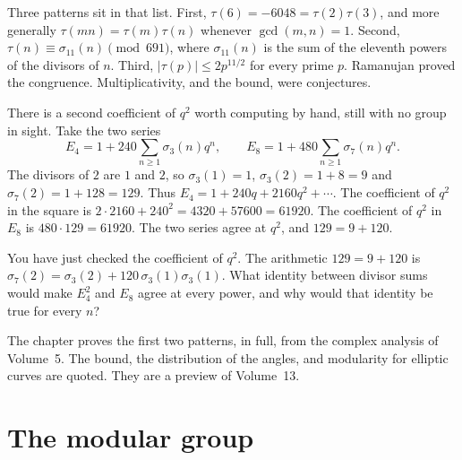 Three patterns sit in that list. First, $\tau(6)=-6048=\tau(2)\tau(3)$, and more generally $\tau(mn)=\tau(m)\tau(n)$ whenever $\gcd(m,n)=1$. Second, $\tau(n)\equiv\sigma_{11}(n)\pmod{691}$, where $\sigma_{11}(n)$ is the sum of the eleventh powers of the divisors of $n$. Third, $|\tau(p)|\le2p^{11/2}$ for every prime $p$. Ramanujan proved the congruence. Multiplicativity, and the bound, were conjectures.

There is a second coefficient of $q^2$ worth computing by hand, still with no group in sight. Take the two series
\[
E_4=1+240\sum_{n\ge1}\sigma_3(n)q^n,\qquad E_8=1+480\sum_{n\ge1}\sigma_7(n)q^n.
\]
The divisors of $2$ are $1$ and $2$, so $\sigma_3(1)=1$, $\sigma_3(2)=1+8=9$ and $\sigma_7(2)=1+128=129$. Thus $E_4=1+240q+2160q^2+\cdots$. The coefficient of $q^2$ in the square is $2\cdot2160+240^2=4320+57600=61920$. The coefficient of $q^2$ in $E_8$ is $480\cdot129=61920$. The two series agree at $q^2$, and $129=9+120$.

\begin{think}
You have just checked the coefficient of $q^2$. The arithmetic $129=9+120$ is $\sigma_7(2)=\sigma_3(2)+120\,\sigma_3(1)\sigma_3(1)$. What identity between divisor sums would make $E_4^2$ and $E_8$ agree at every power, and why would that identity be true for every $n$?
\end{think}

The chapter proves the first two patterns, in full, from the complex analysis of Volume~5. The bound, the distribution of the angles, and modularity for elliptic curves are quoted. They are a preview of Volume~13.

\section{The modular group}

